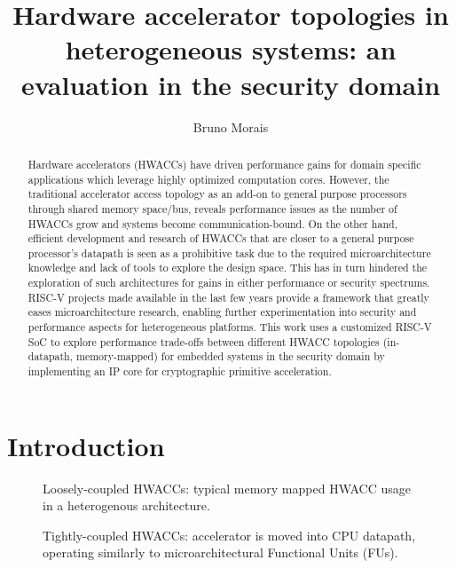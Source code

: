 \documentclass[10pt,conference]{IEEEtran}
\title{\textbf{Hardware accelerator topologies in heterogeneous systems: an evaluation in the
    security domain}}
\author{Bruno Morais}
\date{}
\begin{document}
\maketitle

\begin{abstract}
  Hardware accelerators (HWACCs) have driven performance gains for
  domain specific applications which leverage highly optimized computation
  cores. However, the traditional accelerator access topology as an add-on to
  general purpose processors through shared memory space/bus, reveals performance
  issues as the number of HWACCs grow and systems become
  communication-bound.
  On the other hand, efficient development and research of HWACCs
  that are closer to a general purpose processor's datapath is seen as a
  prohibitive task due to the required microarchitecture knowledge and lack of
  tools to explore the design space. This has in turn hindered the exploration of
  such architectures for gains in either performance or security spectrums.
  RISC-V projects made available in the last few years provide a framework that
  greatly eases microarchitecture research, enabling further experimentation
  into security and performance aspects for heterogeneous platforms.
  This work uses a customized RISC-V SoC to explore performance trade-offs
  between different HWACC topologies (in-datapath, memory-mapped) for embedded
  systems in the security domain by implementing an IP core for cryptographic
  primitive acceleration.

\end{abstract}

\section{Introduction}

\begin{figure}
  \centering
  
  \caption{Loosely-coupled HWACCs: typical memory mapped HWACC usage in a heterogenous architecture.}
\end{figure}

\begin{figure}
  \centering
  \caption{Tightly-coupled HWACCs: accelerator is moved into CPU datapath,
    operating similarly to microarchitectural Functional Units (FUs).}
\end{figure}
\end{document}
